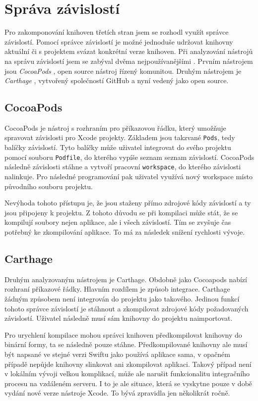\section{Správa závislostí}\label{analyza-sprava-zavislosti}

Pro zakomponování knihoven třetích stran jsem se rozhodl využít správce závislostí.
Pomocí správce závislostí je možné jednoduše udržovat knihovny aktuální či s projektem svázat konkrétní verze knihoven.
Při analyzování nástrojů na správu závislostí jsem se zabýval dvěma nejpoužívanějšími \cite{shashikantjagtap-swift-dependency-management}.
Prvním nástrojem jsou \textit{CocoaPods} \cite{cocoapods-about}, open source nástroj řízený komunitou.
Druhým nástrojem je \textit{Carthage} \cite{github-carthage}, vytvořený společností GitHub a nyní vedený jako open source.

\subsection{CocoaPods}

CocoaPods je nástroj s rozhraním pro příkazovou řádku, který umožňuje spravovat závislosti pro Xcode projekty.
Základem jsou takzvané \texttt{Pods}, tedy balíčky závislostí.
Tyto balíčky může uživatel integrovat do svého projektu pomocí souboru \texttt{Podfile}, do kterého vypíše seznam seznam závislostí.
CocoaPods následně závislosti stáhne a vytvoří pracovní \texttt{workspace}, do kterého závislosti nalinkuje.
Pro následné programování pak uživatel využívá nový workspace místo původního souboru projektu.

Nevýhoda tohoto přístupu je, že jsou staženy přímo zdrojové kódy závislostí a ty jsou připojeny k projektu.
Z tohoto důvodu se při kompilaci může stát, že se kompilují soubory nejen aplikace, ale i všech závislostí.
Tím se zvyšuje čas potřebný ke zkompilování aplikace.
To má za následek snížení rychlosti vývoje.

\subsection{Carthage}

Druhým analyzovaným nástrojem je Carthage.
Obdobně jako Cocoapods nabízí rozhraní příkazové řádky.
Hlavním rozdílem je způsob integrace.
Carthage žádným způsobem není integrován do projektu jako takového.
Jedinou funkcí tohoto správce závislostí je stáhnout a zkompilovat zdrojové kódy požadovaných závislostí.
Uživatel následně musí sám knihovny do projektu naimportovat.

Pro urychlení kompilace mohou správci knihoven předkompilovat knihovny do binární formy, ta se následně pouze stáhne.
Předkompilované knihovny ale musí být napsané ve stejné verzi Swiftu jako používá aplikace sama, v opačném případě nepůjde knihovny slinkovat ani zkompilovat aplikaci.
Takový případ není v lokálním vývoji velkou komplikací, může ale narušit funkcionalitu integračního procesu na vzdáleném serveru.
I to je ale situace, která se vyskytne pouze v době vydání nové verze nástroje Xcode.
To bývá zpravidla jen několikrát ročně.
